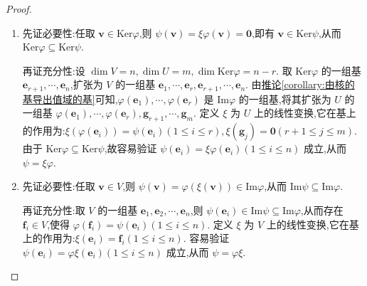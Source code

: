 \documentclass[../../main.tex]{subfiles}
\begin{document}
\begin{proof}
\begin{enumerate}[(1)]
\item 先证必要性:任取 \(\boldsymbol{v}\in\text{Ker}\varphi\),则 \(\psi(\boldsymbol{v}) = \xi\varphi(\boldsymbol{v}) = \boldsymbol{0}\),即有 \(\boldsymbol{v}\in\text{Ker}\psi\),从而 \(\text{Ker}\varphi\subseteq\text{Ker}\psi\). 

再证充分性:设 \(\dim V = n,\dim U = m,\dim\text{Ker}\varphi = n - r\). 取 \(\text{Ker}\varphi\) 的一组基 \(\boldsymbol{e}_{r + 1},\cdots,\boldsymbol{e}_n\),扩张为 \(V\) 的一组基 \(\boldsymbol{e}_1,\cdots,\boldsymbol{e}_r,\boldsymbol{e}_{r + 1},\cdots,\boldsymbol{e}_n\). 由\hyperref[corollary:由核的基导出值域的基]{推论\ref{corollary:由核的基导出值域的基}}可知,\(\varphi(\boldsymbol{e}_1),\cdots,\varphi(\boldsymbol{e}_r)\) 是 \(\text{Im}\varphi\) 的一组基,将其扩张为 \(U\) 的一组基 \(\varphi(\boldsymbol{e}_1),\cdots,\varphi(\boldsymbol{e}_r),\boldsymbol{g}_{r + 1},\cdots,\boldsymbol{g}_m\). 定义 \(\xi\) 为 \(U\) 上的线性变换,它在基上的作用为:\(\xi(\varphi(\boldsymbol{e}_i)) = \psi(\boldsymbol{e}_i)(1\leqslant  i\leqslant  r),\xi(\boldsymbol{g}_j) = \boldsymbol{0}(r + 1\leqslant  j\leqslant  m)\). 由于 \(\text{Ker}\varphi\subseteq\text{Ker}\psi\),故容易验证 \(\psi(\boldsymbol{e}_i) = \xi\varphi(\boldsymbol{e}_i)(1\leqslant  i\leqslant  n)\) 成立,从而 \(\psi = \xi\varphi\).

\item 先证必要性:任取 \(\boldsymbol{v}\in V\),则 \(\psi(\boldsymbol{v}) = \varphi(\xi(\boldsymbol{v}))\in\text{Im}\varphi\),从而 \(\text{Im}\psi\subseteq\text{Im}\varphi\). 

再证充分性:取 \(V\) 的一组基 \(\boldsymbol{e}_1,\boldsymbol{e}_2,\cdots,\boldsymbol{e}_n\),则 \(\psi(\boldsymbol{e}_i)\in\text{Im}\psi\subseteq\text{Im}\varphi\),从而存在 \(\boldsymbol{f}_i\in V\),使得 \(\varphi(\boldsymbol{f}_i) = \psi(\boldsymbol{e}_i)(1\leqslant  i\leqslant  n)\). 定义 \(\xi\) 为 \(V\) 上的线性变换,它在基上的作用为:\(\xi(\boldsymbol{e}_i) = \boldsymbol{f}_i(1\leqslant  i\leqslant  n)\). 容易验证 \(\psi(\boldsymbol{e}_i) = \varphi\xi(\boldsymbol{e}_i)(1\leqslant  i\leqslant  n)\) 成立,从而 \(\psi = \varphi\xi\).
\end{enumerate}

\end{proof}
\end{document}
